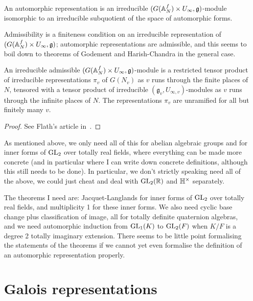 \begin{definition}\label{automorphic_representation}\notready An automorphic representation is an irreducible $(G(\mathbb{A}_N^f)\times U_\infty,\mathfrak{g})$-module isomorphic to an irreducible subquotient of the space of automorphic forms.
\end{definition}

Admissibility is a finiteness condition on an irreducible representation of $(G(\mathbb{A}_N^f)\times U_\infty,\mathfrak{g})$; automorphic representations are admissible, and this seems to boil down to theorems of Godement and Harish-Chandra in the general case. 


\begin{theorem}\label{automorphic_representation_local_decomposition}\notready An irreducible admissible $(G(\mathbb{A}_N^f)\times U_\infty,\mathfrak{g})$-module is a restricted tensor product of irreducible representations $\pi_v$ of $G(N_v)$ as $v$ runs through the finite places of $N$, tensored with a tensor product of irreducible $(\mathfrak{g}_v,U_{\infty,v})$-modules as $v$ runs through the infinite places of $N$. The representations $\pi_v$ are unramified for all but finitely many $v$.
\end{theorem}
\begin{proof} See Flath's article in~\cite{corvallis2}.
\end{proof}

As mentioned above, we only need all of this for abelian algebraic groups and for inner forms of $\operatorname{GL}_2$ over totally real fields, where everything can be made more concrete (and in particular where I can write down concrete definitions, although this still needs to be done). In particular, we don't strictly speaking need all of the above, we could just cheat and deal with $\operatorname{GL}_2(\mathbb{R})$ and $\mathbb{H}^\times$ separately.

The theorems I need are: Jacquet-Langlands for inner forms of $\operatorname{GL}_2$ over totally real fields, 
and multiplicity 1 for these inner forms. We also need cyclic base change plus classification of image, all for totally definite quaternion algebras, and we need
automorphic induction from $\operatorname{GL}_1(K)$ to $\operatorname{GL}_2(F)$ when $K/F$ is a degree 2 totally imaginary extension. There seems to be little point formalising the statements of the theorems if we cannot yet even formalise the definition of an automorphic representation properly.

\section{Galois representations}

